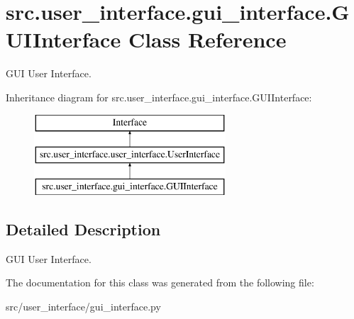 \hypertarget{classsrc_1_1user__interface_1_1gui__interface_1_1_g_u_i_interface}{}\section{src.\+user\+\_\+interface.\+gui\+\_\+interface.\+G\+U\+I\+Interface Class Reference}
\label{classsrc_1_1user__interface_1_1gui__interface_1_1_g_u_i_interface}


G\+UI User Interface.  


Inheritance diagram for src.\+user\+\_\+interface.\+gui\+\_\+interface.\+G\+U\+I\+Interface\+:\begin{figure}[H]
\begin{center}
\leavevmode
\includegraphics[height=3.000000cm]{classsrc_1_1user__interface_1_1gui__interface_1_1_g_u_i_interface}
\end{center}
\end{figure}


\subsection{Detailed Description}
G\+UI User Interface. 

The documentation for this class was generated from the following file\+:\begin{DoxyCompactItemize}
\item 
src/user\+\_\+interface/gui\+\_\+interface.\+py\end{DoxyCompactItemize}
